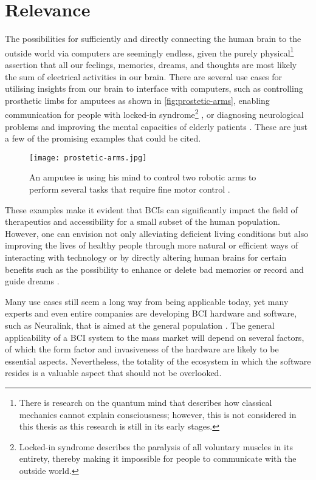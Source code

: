 \section{Relevance}
\label{chapter1-relevance}

The possibilities for sufficiently and directly connecting the human brain to the outside world via computers are seemingly endless, given the purely physical\footnote{There is research on the quantum mind that describes how classical mechanics cannot explain consciousness; however, this is not considered in this thesis as this research is still in its early stages.} assertion that all our feelings, memories, dreams, and thoughts are most likely the sum of electrical activities in our brain. There are several use cases for utilising insights from our brain to interface with computers, such as controlling prosthetic limbs for amputees \citep{campbell_amputee_2014} as shown in \autoref{fig:prostetic-arms}, enabling communication for people with locked-in syndrome\footnote{Locked-in syndrome describes the paralysis of all voluntary muscles in its entirety, thereby making it impossible for people to communicate with the outside world.} \citep{chaudhary_spelling_2022}, or diagnosing neurological problems and improving the mental capacities of elderly patients \citep{belkacem_brain_2020}. These are just a few of the promising examples that could be cited.

\begin{figure}[ht]
  \centering
  \texttt{[image: prostetic-arms.jpg]}
  \caption[An amputee is using his mind to control two robotic arms to perform several tasks that require fine motor control.]{An amputee is using his mind to control two robotic arms to perform several tasks that require fine motor control \citep{campbell_amputee_2014}.}
  \label{fig:prostetic-arms}
\end{figure}

These examples make it evident that BCIs can significantly impact the field of therapeutics and accessibility for a small subset of the human population. However, one can envision not only alleviating deficient living conditions but also improving the lives of healthy people through more natural or efficient ways of interacting with technology or by directly altering human brains for certain benefits such as the possibility to enhance or delete bad memories \citep{spiers_enhance_2014} or record and guide dreams \citep{haar_horowitz_dormio_2020}.

Many use cases still seem a long way from being applicable today, yet many experts and even entire companies are developing BCI hardware and software, such as Neuralink, that is aimed at the general population \citep{urban_neuralink_2017}. The general applicability of a BCI system to the mass market will depend on several factors, of which the form factor and invasiveness of the hardware are likely to be essential aspects. Nevertheless, the totality of the ecosystem in which the software resides is a valuable aspect that should not be overlooked.

